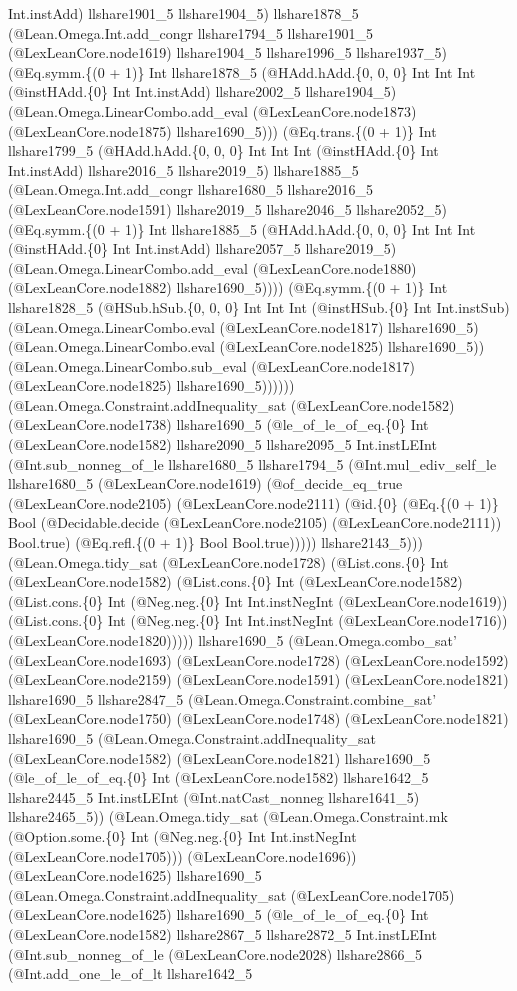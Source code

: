 \documentclass[11pt]{article}
\begin{document}
Int.instAdd) llshare1901\_5 llshare1904\_5) llshare1878\_5 (@Lean.Omega.Int.add\_congr llshare1794\_5 llshare1901\_5 (@LexLeanCore.node1619) llshare1904\_5 llshare1996\_5 llshare1937\_5) (@Eq.symm.\{(0 + 1)\} Int llshare1878\_5 (@HAdd.hAdd.\{0, 0, 0\} Int Int Int (@instHAdd.\{0\} Int Int.instAdd) llshare2002\_5 llshare1904\_5) (@Lean.Omega.LinearCombo.add\_eval (@LexLeanCore.node1873) (@LexLeanCore.node1875) llshare1690\_5))) (@Eq.trans.\{(0 + 1)\} Int llshare1799\_5 (@HAdd.hAdd.\{0, 0, 0\} Int Int Int (@instHAdd.\{0\} Int Int.instAdd) llshare2016\_5 llshare2019\_5) llshare1885\_5 (@Lean.Omega.Int.add\_congr llshare1680\_5 llshare2016\_5 (@LexLeanCore.node1591) llshare2019\_5 llshare2046\_5 llshare2052\_5) (@Eq.symm.\{(0 + 1)\} Int llshare1885\_5 (@HAdd.hAdd.\{0, 0, 0\} Int Int Int (@instHAdd.\{0\} Int Int.instAdd) llshare2057\_5 llshare2019\_5) (@Lean.Omega.LinearCombo.add\_eval (@LexLeanCore.node1880) (@LexLeanCore.node1882) llshare1690\_5)))) (@Eq.symm.\{(0 + 1)\} Int llshare1828\_5 (@HSub.hSub.\{0, 0, 0\} Int Int Int (@instHSub.\{0\} Int Int.instSub) (@Lean.Omega.LinearCombo.eval (@LexLeanCore.node1817) llshare1690\_5) (@Lean.Omega.LinearCombo.eval (@LexLeanCore.node1825) llshare1690\_5)) (@Lean.Omega.LinearCombo.sub\_eval (@LexLeanCore.node1817) (@LexLeanCore.node1825) llshare1690\_5)))))) (@Lean.Omega.Constraint.addInequality\_sat (@LexLeanCore.node1582) (@LexLeanCore.node1738) llshare1690\_5 (@le\_of\_le\_of\_eq.\{0\} Int (@LexLeanCore.node1582) llshare2090\_5 llshare2095\_5 Int.instLEInt (@Int.sub\_nonneg\_of\_le llshare1680\_5 llshare1794\_5 (@Int.mul\_ediv\_self\_le llshare1680\_5 (@LexLeanCore.node1619) (@of\_decide\_eq\_true (@LexLeanCore.node2105) (@LexLeanCore.node2111) (@id.\{0\} (@Eq.\{(0 + 1)\} Bool (@Decidable.decide (@LexLeanCore.node2105) (@LexLeanCore.node2111)) Bool.true) (@Eq.refl.\{(0 + 1)\} Bool Bool.true))))) llshare2143\_5))) (@Lean.Omega.tidy\_sat (@LexLeanCore.node1728) (@List.cons.\{0\} Int (@LexLeanCore.node1582) (@List.cons.\{0\} Int (@LexLeanCore.node1582) (@List.cons.\{0\} Int (@Neg.neg.\{0\} Int Int.instNegInt (@LexLeanCore.node1619)) (@List.cons.\{0\} Int (@Neg.neg.\{0\} Int Int.instNegInt (@LexLeanCore.node1716)) (@LexLeanCore.node1820))))) llshare1690\_5 (@Lean.Omega.combo\_sat' (@LexLeanCore.node1693) (@LexLeanCore.node1728) (@LexLeanCore.node1592) (@LexLeanCore.node2159) (@LexLeanCore.node1591) (@LexLeanCore.node1821) llshare1690\_5 llshare2847\_5 (@Lean.Omega.Constraint.combine\_sat' (@LexLeanCore.node1750) (@LexLeanCore.node1748) (@LexLeanCore.node1821) llshare1690\_5 (@Lean.Omega.Constraint.addInequality\_sat (@LexLeanCore.node1582) (@LexLeanCore.node1821) llshare1690\_5 (@le\_of\_le\_of\_eq.\{0\} Int (@LexLeanCore.node1582) llshare1642\_5 llshare2445\_5 Int.instLEInt (@Int.natCast\_nonneg llshare1641\_5) llshare2465\_5)) (@Lean.Omega.tidy\_sat (@Lean.Omega.Constraint.mk (@Option.some.\{0\} Int (@Neg.neg.\{0\} Int Int.instNegInt (@LexLeanCore.node1705))) (@LexLeanCore.node1696)) (@LexLeanCore.node1625) llshare1690\_5 (@Lean.Omega.Constraint.addInequality\_sat (@LexLeanCore.node1705) (@LexLeanCore.node1625) llshare1690\_5 (@le\_of\_le\_of\_eq.\{0\} Int (@LexLeanCore.node1582) llshare2867\_5 llshare2872\_5 Int.instLEInt (@Int.sub\_nonneg\_of\_le (@LexLeanCore.node2028) llshare2866\_5 (@Int.add\_one\_le\_of\_lt llshare1642\_5 
\end{document}
